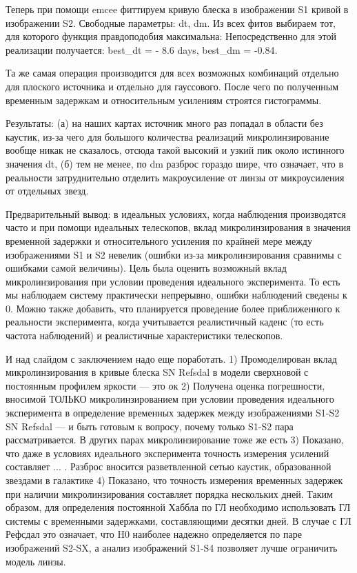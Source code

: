 Теперь при помощи emcee фиттируем кривую блеска в изображении S1 кривой в изображении S2. Свободные параметры: dt, dm. Из всех фитов выбираем тот, для которого функция правдоподобия максимальна: Непосредственно для этой реализации получается: best_dt = - 8.6 days, best_dm = -0.84.

Та же самая операция производится для всех возможных комбинаций отдельно для плоского источника и отдельно для гауссового. После чего по полученным временным задержкам и относительным усилениям строятся гистограммы. 

Результаты:
(а) на наших картах источник много раз попадал в области без каустик, из-за чего для большого количества реализаций микролинзирование вообще никак не сказалось, отсюда такой высокий и узкий пик около истинного значения dt,
(б) тем не менее, по dm разброс гораздо шире, что означает, что в реальности затруднительно отделить макроусиление от линзы от микроусиления от отдельных звезд. 

Предварительный вывод: в идеальных условиях, когда наблюдения производятся часто и при помощи идеальных телескопов,  вклад микролинзирования в значения временной задержки и относительного усиления по крайней мере между изображениями S1 и S2 невелик (ошибки из-за микролинзирования сравнимы с ошибками самой величины). Цель была оценить возможный вклад микролинзирования при условии проведения идеального эксперимента. То есть мы наблюдаем систему практически непрерывно, ошибки наблюдений сведены к 0. Можно также добавить, что планируется проведение более приближенного к реальности эксперимента, когда учитывается реалистичный каденс (то есть частота наблюдений) и реалистичные характеристики телескопов.

И над слайдом с заключением надо еще поработать.
1) Промоделирован вклад микролинзирования в кривые блеска SN Refsdal в модели сверхновой с постоянным профилем яркости — это ок
2) Получена оценка погрешности, вносимой ТОЛЬКО микролинзированием при условии проведения идеального эксперимента в определение временных задержек между изображениями S1-S2 SN Refsdal
— и быть готовым к вопросу, почему только S1-S2 пара рассматривается. В других парах микролинзирование тоже же есть
3) Показано, что даже в условиях идеального эксперимента точность измерения усилений составляет ... . Разброс вносится разветвленной сетью каустик, образованной звездами в галактике
4) Показано, что точность измерения временных задержек при наличии микролинзирования составляет порядка нескольких дней. Таким образом, для определения постоянной Хаббла по ГЛ необходимо использовать ГЛ системы с временными задержками, составляющими десятки дней. В случае с ГЛ Рефсдал это означает, что H0 наиболее надежно определяется по паре изображений S2-SX, а анализ изображений S1-S4 позволяет лучше ограничить модель линзы.


